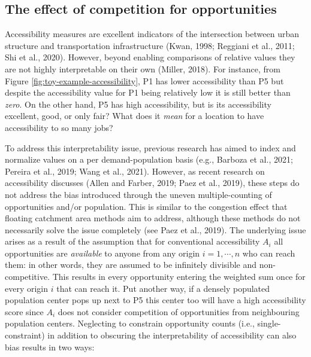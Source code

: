 \documentclass[]{elsarticle} %
\begin{document}
\hypertarget{the-effect-of-competition-for-opportunities}{%
\subsection{The effect of competition for
opportunities}\label{the-effect-of-competition-for-opportunities}}

Accessibility measures are excellent indicators of the intersection
between urban structure and transportation infrastructure (Kwan, 1998;
Reggiani et al., 2011; Shi et al., 2020). However, beyond enabling
comparisons of relative values they are not highly interpretable on
their own (Miller, 2018). For instance, from Figure
\ref{fig:toy-example-accessibility}, P1 has lower accessibility than P5
but despite the accessibility value for P1 being relatively low it is
still better than \emph{zero}. On the other hand, P5 has high
accessibility, but is its accessibility excellent, good, or only fair?
What does it \emph{mean} for a location to have accessibility to so many
jobs?

To address this interpretability issue, previous research has aimed to
index and normalize values on a per demand-population basis (e.g.,
Barboza et al., 2021; Pereira et al., 2019; Wang et al., 2021). However,
as recent research on accessibility discusses (Allen and Farber, 2019;
Paez et al., 2019), these steps do not address the bias introduced
through the uneven multiple-counting of opportunities and/or population.
This is similar to the congestion effect that floating catchment area
methods aim to address, although these methods do not necessarily solve
the issue completely (see Paez et al., 2019). The underlying issue
arises as a result of the assumption that for conventional accessibility
\(A_i\) all opportunities are \emph{available} to anyone from any origin
\(i=1,\cdots,n\) who can reach them: in other words, they are assumed to
be infinitely divisible and non-competitive. This results in every
opportunity entering the weighted sum once for every origin \(i\) that
can reach it. Put another way, if a densely populated population center
pops up next to P5 this center too will have a high accessibility score
since \(A_i\) does not consider competition of opportunities from
neighbouring population centers. Neglecting to constrain opportunity
counts (i.e., single-constraint) in addition to obscuring the
interpretability of accessibility can also bias results in two ways:
\end{document}
